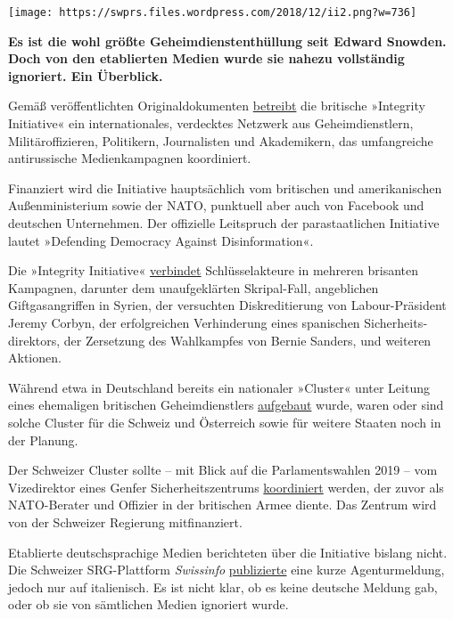 \texttt{[image: https://swprs.files.wordpress.com/2018/12/ii2.png?w=736]}

\textbf{Es ist die wohl größte Geheimdienstenthüllung seit Edward
Snowden. Doch von den etablierten Medien wurde sie nahezu vollständig
ignoriert. Ein Überblick.}

Gemäß veröffentlichten Originaldokumenten
\href{https://thegrayzone.com/2018/12/17/inside-the-temple-of-covert-propaganda-the-integrity-initiative-and-the-uks-scandalous-information-war/}{betreibt}
die britische »Integrity Initiative« ein internationales, verdecktes
Netzwerk aus Geheimdienstlern, Militäroffizieren, Politikern,
Journalisten und Akademikern, das umfangreiche antirussische
Medienkampagnen koordiniert.

Finanziert wird die Initiative hauptsächlich vom britischen und
amerikanischen Außenministerium sowie der NATO, punktuell aber auch von
Facebook und deutschen Unternehmen. Der offizielle Leitspruch der
parastaatlichen Initiative lautet »Defending Democracy Against
Disinformation«.

Die »Integrity Initiative«
\href{http://syriapropagandamedia.org/working-papers/briefing-note-on-the-integrity-initiative}{verbindet}
Schlüsselakteure in mehreren brisanten Kampagnen, darunter dem
unaufgeklärten Skripal-Fall, angeblichen Giftgasangriffen in Syrien, der
versuchten Diskre­di­tie­rung von Labour-Präsident Jeremy Corbyn, der
erfolgreichen Verhinderung eines spanischen Sicher­heits­direktors, der
Zersetzung des Wahlkampfes von Bernie Sanders, und weiteren Aktionen.

Während etwa in Deutschland bereits ein nationaler »Cluster« unter
Leitung eines ehemaligen britischen Geheimdienstlers
\href{https://www.nachdenkseiten.de/?p=48281}{aufgebaut} wurde, waren
oder sind solche Cluster für die Schweiz und Österreich sowie für
weitere Staaten noch in der Planung.

Der Schweizer Cluster sollte -- mit Blick auf die Parlamentswahlen 2019
-- vom Vizedirektor eines Genfer Sicherheitszentrums
\href{https://www.pdf-archive.com/2018/11/02/xcountry/xcountry.pdf}{koordiniert}
werden, der zuvor als NATO-Berater und Offizier in der britischen Armee
diente. Das Zentrum wird von der Schweizer Regierung mitfinanziert.

Etablierte deutschsprachige Medien berichteten über die Initiative
bislang nicht. Die Schweizer SRG-Plattform \emph{Swissinfo}
\href{https://www.swissinfo.ch/ita/anonymous-svela--rete-anti-russia-/44568710}{publizierte}
eine kurze Agenturmeldung, jedoch nur auf italienisch. Es ist nicht
klar, ob es keine deutsche Meldung gab, oder ob sie von sämtlichen
Medien ignoriert wurde.

